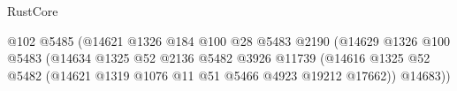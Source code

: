 \begin{lexlean}{RustCore}
\begin{coremodule}
                                                                  @102
                                                                  @5485
                                                                  (@14621
                                                                    @1326
                                                                    @184
                                                                    @100
                                                                    @28
                                                                    @5483
                                                                    @2190
                                                                    (@14629
                                                                      @1326
                                                                      @100
                                                                      @5483
                                                                      (@14634
                                                                        @1325
                                                                        @52
                                                                        @2136
                                                                        @5482
                                                                        @3926
                                                                        @11739
                                                                        (@14616
                                                                          @1325
                                                                          @52
                                                                          @5482
                                                                          (@14621
                                                                            @1319
                                                                            @1076
                                                                            @11
                                                                            @51
                                                                            @5466
                                                                            @4923
                                                                            @19212
                                                                            @17662))
                                                                        @14683))

\end{coremodule}
\end{lexlean}
